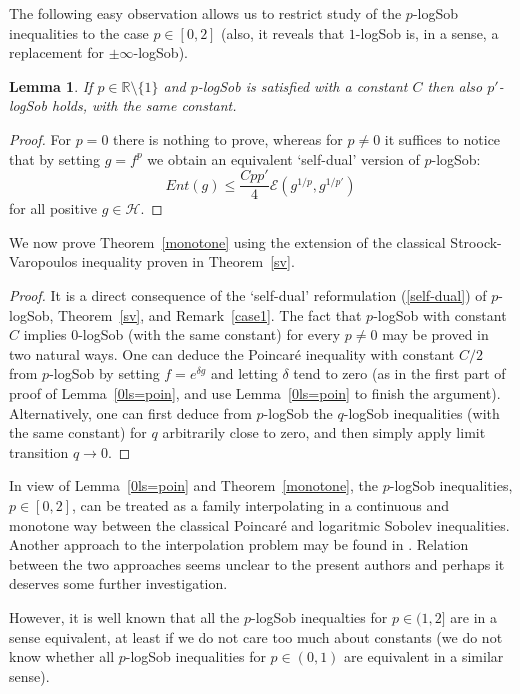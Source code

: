 \documentclass[11pt]{amsart}
\newcommand{\R}{\mathbb{R}}
\newcommand{\1}{\mathbf{1}}
\def\R{{\mathbb R}}
\def\e{{\mathcal{E}}}
\def\H{{\mathcal{H}}}
\theoremstyle{definition}
\theoremstyle{plain}
\newtheorem{lemma}[example]{Lemma}
\theoremstyle{remark}
\numberwithin{equation}{section}
\begin{document}
The following easy observation allows us to restrict study of the $p$-logSob inequalities to the case $p \in [0,2]$ (also, it reveals that $1$-logSob is, in a sense, a replacement for $\pm \infty$-logSob).

\begin{lemma} \label{lsdual}
If $p \in \R \setminus \{ 1\}$ and $p$-logSob is satisfied with a constant $C$ then also $p'$-logSob holds, with the same constant.
\end{lemma}

\begin{proof}
For $p=0$ there is nothing to prove, whereas for $p \neq 0$
it suffices to notice that by setting $g=f^{p}$ we obtain an equivalent `self-dual' version of $p$-logSob:
\begin{equation} \label{self-dual}
Ent(g) \leq \frac{Cpp'}{4}\e(g^{1/p},g^{1/p'})
\end{equation}
for all positive $g \in \H$.
\end{proof}

We now prove Theorem~\ref{monotone} using the extension of the classical Stroock-Varopoulos inequality proven in Theorem~\ref{sv}.

\begin{proof}
It is a direct consequence of the `self-dual' reformulation (\ref{self-dual}) of $p$-logSob, Theorem~\ref{sv}, and Remark~\ref{case1}.
The fact that $p$-logSob with constant $C$ implies $0$-logSob (with the same constant) for every $p \neq 0$ may be proved in two natural ways.
One can deduce the Poincar\'e inequality with constant $C/2$ from $p$-logSob by setting $f=e^{\delta g}$
and letting $\delta$ tend to zero (as in the first part of proof of Lemma~\ref{0ls=poin},
and use Lemma~\ref{0ls=poin} to finish the argument).
Alternatively, one can first deduce from $p$-logSob the $q$-logSob inequalities (with the same constant) for $q$ arbitrarily close to zero,
and then simply apply limit transition $q \to 0$.
\end{proof}

In view of Lemma~\ref{0ls=poin} and Theorem~\ref{monotone}, the $p$-logSob inequalities, $p \in [0,2]$,
can be treated as a family interpolating in a continuous and monotone way between the classical Poincar\'e and logaritmic Sobolev inequalities.
Another approach to the interpolation problem may be found in \cite{Latala00}.
Relation between the two approaches seems unclear to the present authors and perhaps it deserves some further investigation.

However, it is well known that all the $p$-logSob inequalties for
$p \in (1,2]$ are in a sense equivalent, at least if we do not care too much about constants
(we do not know whether all $p$-logSob inequalities for $p \in (0,1)$ are equivalent in a similar sense).
\end{document}
